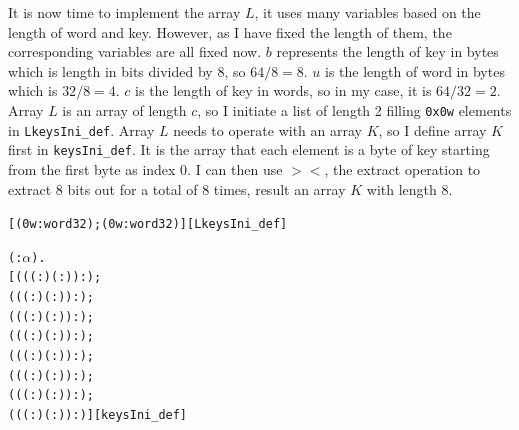 \documentclass{article}
\begin{document}
It is now time to implement the array $L$, it uses many variables based on the length of word and key. However, as I have fixed
the length of them, the corresponding variables are all fixed now. $b$ represents the length of key in bytes which is length in bits
divided by 8, so $64/8=8$. $u$ is the length of word in bytes which is $32/8=4$. $c$ is the length of key in words, so in my case, it
is $64/32=2$. Array $L$ is an array of length $c$, so I initiate a list of length 2 filling \verb|0x0w| elements in
\verb|LkeysIni_def|. Array $L$ needs to operate with an array $K$, so I define array $K$ first in \verb|keysIni_def|. It is
the array that each element is a byte of key starting from the first byte as index 0. I can then use $><$, the extract operation
to extract 8 bits out for a total of 8 times, result an array $K$ with length 8.

\begin{alltt}
\HOLTokenTurnstile{}  \HOLSymConst{=} [(0w :word32); (0w :word32)]\hfill{[LkeysIni_def]}
\end{alltt}

\begin{alltt}
\HOLTokenTurnstile{} \HOLSymConst{\HOLTokenForall{}}( :\ensuremath{\alpha} ).
       \HOLSymConst{=}
     [((( :) \HOLSymConst{\HOLTokenExtract{}} ( :))  :);
      ((( :) \HOLSymConst{\HOLTokenExtract{}} ( :))  :);
      ((( :) \HOLSymConst{\HOLTokenExtract{}} ( :))  :);
      ((( :) \HOLSymConst{\HOLTokenExtract{}} ( :))  :);
      ((( :) \HOLSymConst{\HOLTokenExtract{}} ( :))  :);
      ((( :) \HOLSymConst{\HOLTokenExtract{}} ( :))  :);
      ((( :) \HOLSymConst{\HOLTokenExtract{}} ( :))  :);
      ((( :) \HOLSymConst{\HOLTokenExtract{}} ( :))  :)]\hfill{[keysIni_def]}
\end{alltt}
\end{document}
